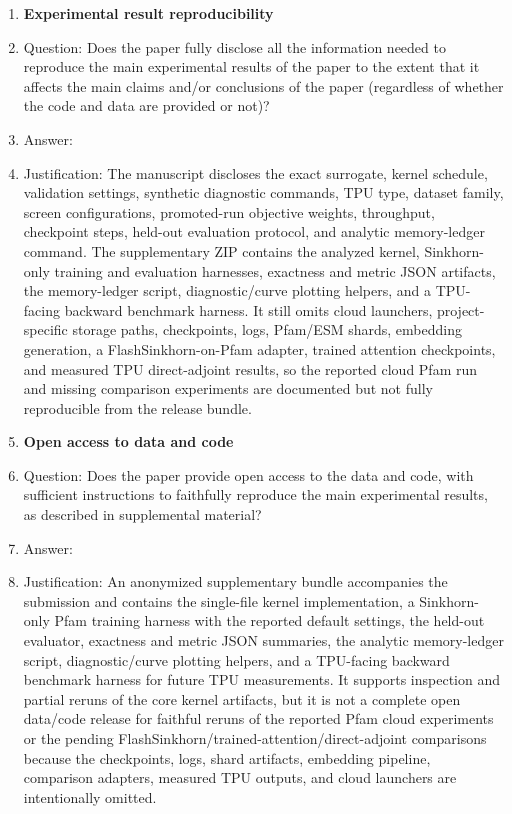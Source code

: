 \begin{enumerate}
\item {\bf Experimental result reproducibility}
    \item[] Question: Does the paper fully disclose all the information needed to reproduce the main experimental results of the paper to the extent that it affects the main claims and/or conclusions of the paper (regardless of whether the code and data are provided or not)?
    \item[] Answer: \answerNo{}
    \item[] Justification: The manuscript discloses the exact surrogate, kernel schedule, validation settings, synthetic diagnostic commands, TPU type, dataset family, screen configurations, promoted-run objective weights, throughput, checkpoint steps, held-out evaluation protocol, and analytic memory-ledger command. The supplementary ZIP contains the analyzed kernel, Sinkhorn-only training and evaluation harnesses, exactness and metric JSON artifacts, the memory-ledger script, diagnostic/curve plotting helpers, and a TPU-facing backward benchmark harness. It still omits cloud launchers, project-specific storage paths, checkpoints, logs, Pfam/ESM shards, embedding generation, a FlashSinkhorn-on-Pfam adapter, trained attention checkpoints, and measured TPU direct-adjoint results, so the reported cloud Pfam run and missing comparison experiments are documented but not fully reproducible from the release bundle.

\item {\bf Open access to data and code}
    \item[] Question: Does the paper provide open access to the data and code, with sufficient instructions to faithfully reproduce the main experimental results, as described in supplemental material?
    \item[] Answer: \answerNo{}
    \item[] Justification: An anonymized supplementary bundle accompanies the submission and contains the single-file kernel implementation, a Sinkhorn-only Pfam training harness with the reported default settings, the held-out evaluator, exactness and metric JSON summaries, the analytic memory-ledger script, diagnostic/curve plotting helpers, and a TPU-facing backward benchmark harness for future TPU measurements. It supports inspection and partial reruns of the core kernel artifacts, but it is not a complete open data/code release for faithful reruns of the reported Pfam cloud experiments or the pending FlashSinkhorn/trained-attention/direct-adjoint comparisons because the checkpoints, logs, shard artifacts, embedding pipeline, comparison adapters, measured TPU outputs, and cloud launchers are intentionally omitted.


\end{enumerate}
